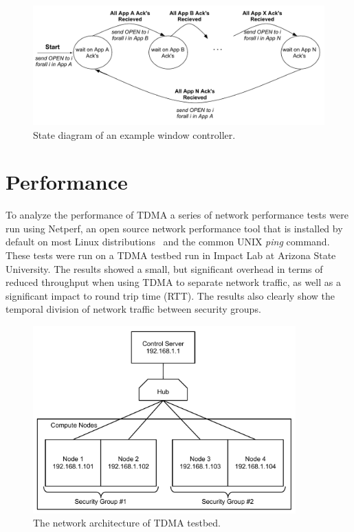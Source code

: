 \documentclass[oneside,12pt]{memoir}
\begin{document}
\begin{figure}
\centering
\includegraphics[scale=0.62]{control_state_diagram.pdf}
\caption{State diagram of an example window controller.}
\label{fig:control_state_diagram}
\end{figure}

\chapter{Performance}
\label{chap:performance}
To analyze the performance of TDMA a series of network performance tests were run using Netperf, an open source network performance tool that is installed by default on most Linux distributions~\cite{netperf} and the common UNIX \textit{ping} command. These tests were run on a TDMA testbed run in Impact Lab at Arizona State University. The results showed a small, but significant overhead in terms of reduced throughput when using TDMA to separate network traffic, as well as a significant impact to round trip time (RTT). The results also clearly show the temporal division of network traffic between security groups. 

\begin{figure}
  \begin{center}
    \includegraphics[width=0.9\textwidth]{tdm_demo_setup.pdf}
  \end{center}
  \caption{The network architecture of TDMA testbed.}
\label{fig:tdm_demo_setup}
\end{figure} 
\end{document}
